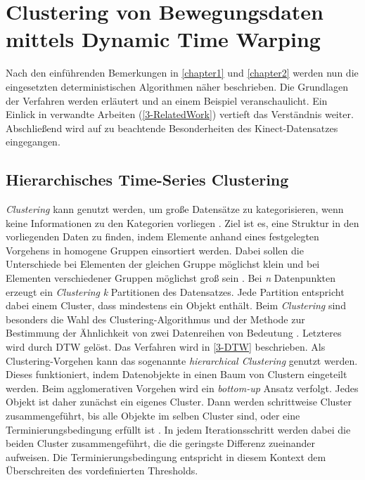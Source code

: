 \chapter{Clustering von Bewegungsdaten mittels Dynamic Time Warping}
\label{chapter3}

Nach den einführenden Bemerkungen in \autoref{chapter1} und \autoref{chapter2} werden nun
die eingesetzten deterministischen Algorithmen näher beschrieben.
Die Grundlagen der Verfahren werden erläutert und an einem Beispiel veranschaulicht.
Ein Einlick in verwandte Arbeiten (\autoref{3-RelatedWork}) vertieft das Verständnis weiter.
Abschließend wird auf zu beachtende Besonderheiten des Kinect-Datensatzes eingegangen.

\section{Hierarchisches Time-Series Clustering}
\label{3-Clustering}
\emph{Clustering} kann genutzt werden, um große Datensätze zu kategorisieren,
wenn keine Informationen zu den Kategorien vorliegen \citep{aghabozorgi_time-series_2015}.
Ziel ist es, eine Struktur in den vorliegenden Daten zu finden,
indem Elemente anhand eines festgelegten Vorgehens in homogene Gruppen einsortiert werden.
Dabei sollen die Unterschiede bei Elementen der gleichen Gruppe möglichst klein
und bei Elementen verschiedener Gruppen möglichst groß sein \citep{aghabozorgi_time-series_2015, warren_liao_clustering_2005}.
Bei \emph{n} Datenpunkten erzeugt ein \emph{Clustering} \emph{k} Partitionen des Datensatzes.
Jede Partition entspricht dabei einem Cluster, dass mindestens ein Objekt enthält.
Beim \emph{Clustering} sind besonders die Wahl des Clustering-Algorithmus
und der Methode zur Bestimmung der Ähnlichkeit von zwei Datenreihen von Bedeutung \citep{warren_liao_clustering_2005}.
Letzteres wird durch \ac{DTW} gelöst.
Das Verfahren wird in \autoref{3-DTW} beschrieben.
Als Clustering-Vorgehen kann das sogenannte \emph{hierarchical Clustering} genutzt werden.
Dieses funktioniert, indem Datenobjekte in einen Baum von Clustern eingeteilt werden.
Beim agglomerativen Vorgehen wird ein \emph{bottom-up} Ansatz verfolgt.
Jedes Objekt ist daher zunächst ein eigenes Cluster.
Dann werden schrittweise Cluster zusammengeführt,
bis alle Objekte im selben Cluster sind, oder eine Terminierungsbedingung erfüllt ist \citep{warren_liao_clustering_2005}.
In jedem Iterationsschritt werden dabei die beiden Cluster zusammengeführt,
die die geringste Differenz zueinander aufweisen.
Die Terminierungsbedingung entspricht in diesem Kontext dem Überschreiten des vordefinierten Thresholds.

